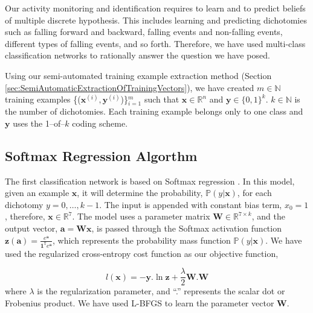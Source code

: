 \documentclass{IEEEtran}
\begin{document}
Our activity monitoring and identification requires to learn and to predict beliefs of 
multiple 
discrete hypothesis. This includes learning and predicting dichotomies such as falling 
forward and 
backward, falling events and non-falling events, different types of falling events, and 
so forth. 
Therefore, 
we have used multi-class classification networks to rationally answer the question we 
have posed.

Using our semi-automated training example extraction method (Section 
\ref{sec:SemiAutomaticExtractionOfTrainingVectors}), we have created $m \in 
\mathbb{N}$ 
training examples 
\{($\mathbf{x}^{(i)}, \mathbf{y}^{(i)}$)\}$_{i=1}^m$ such that $\mathbf{x} \in 
\mathbb{R}^{n}$ 
and 
$\mathbf{y} \in 
\{0,1\}^k$. $k \in 
\mathbb{N}$ is the number of dichotomies. Each training example belongs only to one class 
and $\mathbf{y}$ uses the 1--of--$k$ coding scheme.    

\subsection{Softmax Regression Algorthm}
\label{sec:SoftmaxRegrationAlgorthm}

The first classification network is based on Softmax regression \cite{Bishop06a}. In this 
model, given an 
example $\mathbf{x}$, it will determine the probability, $\mathbb{P}(y | \mathbf{x})$, 
for 
each dichotomy $y=0,\ldots,k-1$. The input is appended with constant bias 
term, $x_0 = 1$, therefore, $\mathbf{x} \in \mathbb{R}^7$. The model uses a parameter 
matrix 
$\mathbf{W} 
\in \mathbb{R}^{7 \times k}$, and the output vector, $\mathbf{a} = \mathbf{Wx}$, is 
passed 
through 
the 
Softmax 
activation function $\mathbf{z(a)} = \frac{e^{\mathbf{a}}}{\mathbf{1}^\mathtt{T}
e^{\mathbf{a}}}$, which represents the probability mass function $\mathbb{P}(y | 
\mathbf{x})$. We have 
used the regularized cross-entropy cost function as our objective function, 

\begin{equation} 
l(\mathbf{x}) = -\mathbf{y}.\ln \mathbf{z} + \frac{\lambda}{2} \mathbf{W}.\mathbf{W}
\label{eq:objective-function}
\end{equation}
 where  $\lambda$ is the regularization parameter, and ``.'' represents the scalar dot  
or Frobenius product.
 We have used L-BFGS \cite{DBLP:conf/icml/LeNCLPN11} to learn the 
parameter vector $\mathbf{W}$.  
\end{document}
